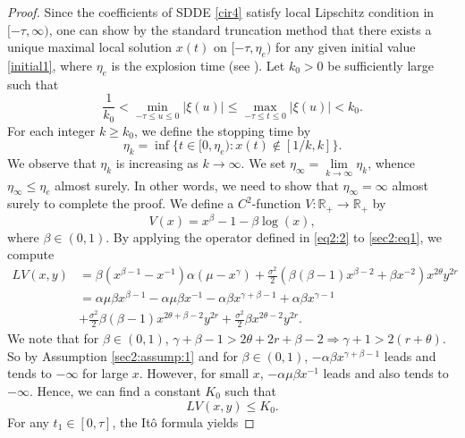 \documentclass[11pt]{article}
\begin{document}
\begin{proof}
Since the coefficients of SDDE \eqref{cir4} satisfy local Lipschitz condition in $[-\tau,\infty)$, one can show by the standard truncation method that there exists a unique maximal local solution $x(t)$ on $[-\tau,\eta_{e})$ for any given initial value \eqref{initial1}, where $\eta_{e}$ is the explosion time (see \cite{Rassias}). Let  $k_0>0$ be sufficiently large such that
\begin{equation*}\label{initial2}
  \frac{1}{k_0}<\underset{-\tau\le u\leq0}{\min}\vert \xi(u)\vert\le \underset{-\tau\le t\le 0}{\max}\vert\xi(u)\vert<k_0.
\end{equation*}
For each integer $k\geq k_0$, we define the stopping time by
\begin{equation}\label{stoptime1}
\eta_k=\inf\{ t\in [0,\eta_{e}): x(t)\not\in [1/k,k]\}.
\end{equation}
We observe that $\eta_k$ is increasing  as $k\rightarrow \infty$. We set $\eta_{\infty}=\underset{k\rightarrow \infty}\lim \eta_k$, whence $\eta_{\infty}\leq \eta_e$ almost surely. In other words, we need to show that $ \eta_{\infty}=\infty$ almost surely to complete the proof. We define a $C^2$-function $V:\mathbb{R_+}\rightarrow \mathbb{R_+}$ by
\begin{equation}\label{sec2:eq1}
V(x)=x^{\beta}-1-\beta\log(x), 
\end{equation}
where $\beta\in(0,1)$. By applying the operator defined in \eqref{eq2:2} to \eqref{sec2:eq1}, we compute
\begin{align*}
 LV(x,y)&=\beta(x^{\beta-1}-x^{-1})\alpha(\mu-x^{\gamma})+\frac{\sigma^2}{2}(\beta(\beta-1)x^{\beta-2}+\beta x^{-2})x^{2\theta}y^{2r}\\
&= \alpha\mu\beta x^{\beta-1}-\alpha\mu\beta x^{-1}-\alpha\beta x^{\gamma+\beta-1}+\alpha\beta x^{\gamma-1}\\
&+\frac{\sigma^2}{2}\beta(\beta-1)x^{2\theta+\beta-2}y^{2r}+\frac{\sigma^2}{2}\beta x^{2\theta-2}y^{2r}.
\end{align*}
We note that for $\beta\in(0,1)$, $\gamma+\beta-1>2\theta+2r+\beta-2\Rightarrow \gamma+1>2(r+\theta)$. So by Assumption \ref{sec2:assump:1} and for $\beta\in(0,1)$, $-\alpha\beta x^{\gamma+\beta-1}$ leads and tends to $-\infty$ for large $x$. However, for small $x$, $-\alpha\mu\beta x^{-1}$ leads and also tends to $-\infty$. Hence, we can find a constant $K_0$ such that 
\begin{equation}\label{last}
LV(x,y)\le K_0. 
\end{equation}
For any $t_1\in [0,\tau]$, the It\^{o} formula yields

\end{proof}
\end{document}

